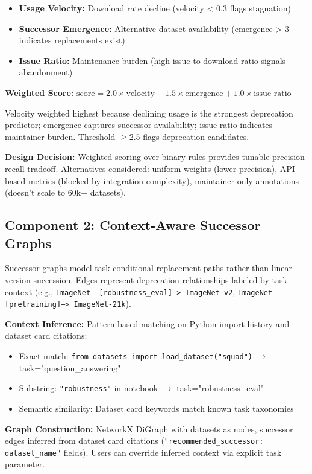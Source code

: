 \begin{itemize}
\item \textbf{Usage Velocity:} Download rate decline (velocity < 0.3 flags stagnation)
\item \textbf{Successor Emergence:} Alternative dataset availability (emergence > 3 indicates replacements exist)
\item \textbf{Issue Ratio:} Maintenance burden (high issue-to-download ratio signals abandonment)
\end{itemize}

\textbf{Weighted Score:} $\text{score} = 2.0 \times \text{velocity} + 1.5 \times \text{emergence} + 1.0 \times \text{issue\_ratio}$

Velocity weighted highest because declining usage is the strongest deprecation predictor; emergence captures successor availability; issue ratio indicates maintainer burden. Threshold $\geq$2.5 flags deprecation candidates.

\textbf{Design Decision:} Weighted scoring over binary rules provides tunable precision-recall tradeoff. Alternatives considered: uniform weights (lower precision), API-based metrics (blocked by integration complexity), maintainer-only annotations (doesn't scale to 60k+ datasets).

\subsection{Component 2: Context-Aware Successor Graphs}

Successor graphs model task-conditional replacement paths rather than linear version succession. Edges represent deprecation relationships labeled by task context (e.g., \texttt{ImageNet --[robustness\_eval]--> ImageNet-v2}, \texttt{ImageNet --[pretraining]--> ImageNet-21k}).

\textbf{Context Inference:} Pattern-based matching on Python import history and dataset card citations:
\begin{itemize}
\item Exact match: \texttt{from datasets import load\_dataset("squad")} $\rightarrow$ task="question\_answering"
\item Substring: \texttt{"robustness"} in notebook $\rightarrow$ task="robustness\_eval"
\item Semantic similarity: Dataset card keywords match known task taxonomies
\end{itemize}

\textbf{Graph Construction:} NetworkX DiGraph with datasets as nodes, successor edges inferred from dataset card citations (\texttt{"recommended\_successor: dataset\_name"} fields). Users can override inferred context via explicit task parameter.

